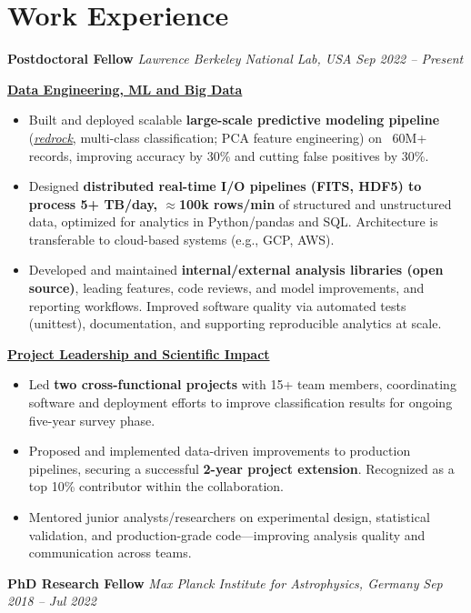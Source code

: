 \documentclass[a4paper,10pt]{article}
\begin{document}
\section*{Work Experience}
\textcolor{sectionblue}{\textbf{Postdoctoral Fellow}} \hfill
\textcolor{sectionblue}{\textit{Lawrence Berkeley National Lab, USA}} \hfill
\textcolor{sectionblue}{\textit{Sep 2022 – Present}}
\vspace{1.5mm}
\begin{adjustwidth}{1em}{0pt}

\textcolor{sectionblue}{\textbf{\underline{Data Engineering, ML and Big Data}}}
\begin{itemize}[leftmargin=*, itemsep=2pt]
    \item Built and deployed scalable \textbf{large-scale predictive modeling pipeline} (\href{https://github.com/desihub/redrock}{\textit{redrock}}, multi-class classification; PCA feature engineering) on ~60M+ records, improving accuracy by 30\% and cutting false positives by 30\%.
    \item Designed \textbf{distributed real-time I/O pipelines (FITS, HDF5) to process 5+ TB/day, $\approx$100k rows/min} of structured and unstructured data, optimized for analytics in Python/pandas and SQL. Architecture is transferable to cloud-based systems (e.g., GCP, AWS).
    \item Developed and maintained \textbf{internal/external analysis libraries (open source)}, leading features, code reviews, and model improvements, and reporting workflows. Improved software quality via automated tests (unittest), documentation, and supporting reproducible analytics at scale.
\end{itemize}
\vspace{-0.5pt}
\textcolor{sectionblue}{\textbf{\underline{Project Leadership and Scientific Impact}}}
\begin{itemize}[leftmargin=*, itemsep=2pt]
    \item Led \textbf{two cross-functional projects} with 15+ team members, coordinating software and deployment efforts to improve classification results for ongoing five-year survey phase.
    \item Proposed and implemented data-driven improvements to production pipelines, securing a successful \textbf{2-year project extension}. Recognized as a top 10\% contributor within the collaboration.
    \item Mentored junior analysts/researchers on experimental design, statistical validation, and production-grade code—improving analysis quality and communication across teams.
\end{itemize}
\end{adjustwidth}
\vspace{2mm}
\textcolor{sectionblue}{\textbf{PhD Research Fellow}} \hfill
\textcolor{sectionblue}{\textit{Max Planck Institute for Astrophysics, Germany}} \hfill
\textcolor{sectionblue}{\textit{Sep 2018 – Jul 2022}}
\end{document}
